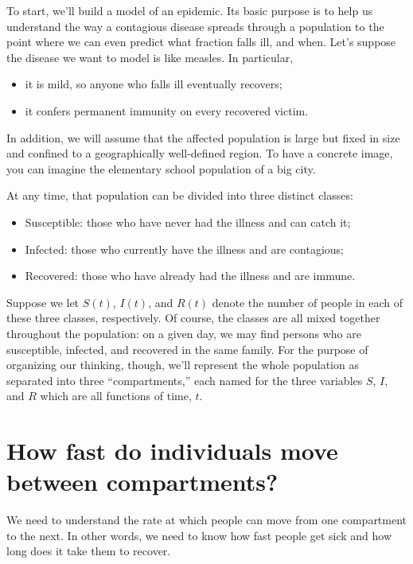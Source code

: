 \documentclass
[justified,nohyper]
{tufte-handout}
\begin{document}
To start, we'll build a model of an epidemic. Its basic purpose is to help us 
understand the way a contagious disease spreads through a population to the point 
where we can even predict what fraction falls ill, and when. Let's suppose the 
disease we want to model is like measles. In particular,

\begin{itemize}
    \item it is mild, so anyone who falls ill eventually recovers;
    \item it confers permanent immunity on every recovered victim.
\end{itemize}

In addition, we will assume that the affected population is large but fixed in 
size and confined to a geographically well-defined region. To have a concrete 
image, you can imagine the elementary school population of a big city.

At any time, that population can be divided into three distinct classes:

\begin{itemize}
    \item Susceptible: those who have never had the illness and can catch it;
    \item Infected: those who currently have the illness and are contagious;
    \item Recovered: those who have already had the illness and are immune.
\end{itemize}

Suppose we let $S(t)$, $I(t)$, and $R(t)$ denote the number of people in
each of these 
three classes, respectively. Of course, the classes are all mixed together 
throughout the population: on a given day, we may find persons who are 
susceptible, infected, and recovered in the same family. For the purpose of 
organizing our thinking, though, we'll represent the whole population as 
separated into three ``compartments,'' each named for the three variables $S$, 
$I$, and $R$ which are all functions of time, $t$.

\section{How fast do individuals move between compartments?} 
We need to understand the rate at which people can move from one compartment to 
the next. In other words, we need to know how fast people get sick and how long 
does it take them to recover.
\end{document}
